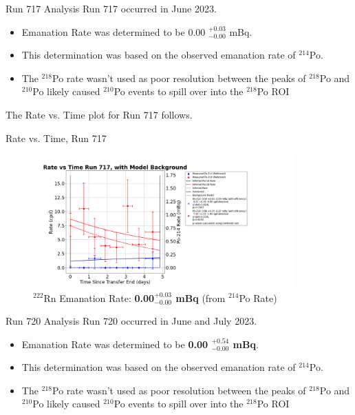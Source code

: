 \documentclass[aspectratio=169]{beamer}
\begin{document}
\begin{frame}{Run 717 Analysis}
    Run 717 occurred in June 2023.
    \begin{itemize}
        \item Emanation Rate was determined to be 0.00 $^{+0.03}_{-0.00}$ mBq.
        \item This determination was based on the observed emanation rate of $^{214}$Po.
        \item The $^{218}$Po rate wasn't used as poor resolution between the peaks of \@
            $^{218}$Po and $^{210}$Po likely caused $^{210}$Po events to spill over\@
            into the $^{218}$Po ROI
    \end{itemize}
    The Rate vs. Time plot for Run 717 follows.
   
    \hyperlink{717_Backup}{}
\end{frame}

\begin{frame}{Rate vs. Time, Run 717}
\label{RvT_717}
    \begin{figure}
        \begin{center}
            \includegraphics[width=0.9\textwidth]
            {assets/717/RvT.png}
            \caption{$^{222}$Rn Emanation Rate: 
            \textbf{0.00$^{+0.03}_{-0.00}$ mBq} (from $^{214}$Po Rate)}
        \end{center}
    \end{figure}  
\end{frame}

\begin{frame}{Run 720 Analysis}
    Run 720 occurred in June and July 2023.
    \begin{itemize}
        \item Emanation Rate was determined to be \textbf{0.00 $^{+0.54}_{-0.00}$ mBq}.
        \item This determination was based on the observed emanation rate of $^{214}$Po.
        \item The $^{218}$Po rate wasn't used as poor resolution between the peaks of \@
            $^{218}$Po and $^{210}$Po likely caused $^{210}$Po events to spill over\@
            into the $^{218}$Po ROI
    \end{itemize}

    \hyperlink{720_Backup}{}
\end{frame}
\end{document}
